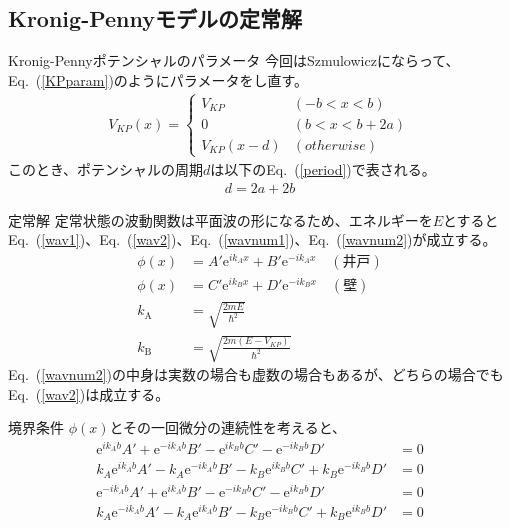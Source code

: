 \documentclass[unicode, 12pt, aspectratio=169]{beamer}
\newcommand{\eref}[1]{Eq.~(\ref{#1})}
\begin{document}
\subsection{Kronig-Pennyモデルの定常解}
\frame{\insertsubsection}

\begin{frame}
  \begin{block}{Kronig-Pennyポテンシャルのパラメータ}
    今回はSzmulowiczにならって、\eref{KPparam}のようにパラメータをし直す。
    \begin{align}
    V_{KP}(x)=\begin{cases}
    V_{KP}&(-b<x<b)\\
    0&(b<x<b+2a)\\
    V_{KP}(x-d)&(otherwise)
    \end{cases}\label{KPparam}
    \end{align}
     このとき、ポテンシャルの周期$d$は以下の\eref{period}で表される。
    \begin{align}
    d=2a+2b\label{period}
    \end{align}
  \end{block}
\end{frame}

\begin{frame}
  \begin{block}{定常解}
    定常状態の波動関数は平面波の形になるため、エネルギーを$E$とすると
    \eref{wav1}、\eref{wav2}、\eref{wavnum1}、\eref{wavnum2}が成立する。
    \begin{align}
    \phi(x)&=A'\mathrm{e}^{ik_Ax}+B'\mathrm{e}^{-ik_Ax}\quad(井戸)\label{wav1}\\
    \phi(x)&=C'\mathrm{e}^{ik_Bx}+D'\mathrm{e}^{-ik_Bx}\quad(壁)\label{wav2}\\
    k_\mathrm{A}&=\sqrt{\frac{2mE}{\hbar^2}}\label{wavnum1}\\
    k_\mathrm{B}&=\sqrt{\frac{2m(E-V_{KP})}{\hbar^2}}\label{wavnum2}
    \end{align}
   \eref{wavnum2}の中身は実数の場合も虚数の場合もあるが、どちらの場合でも\eref{wav2}は成立する。
  \end{block}
\end{frame}

\begin{frame}
  \begin{block}{境界条件}
    $\phi(x)$とその一回微分の連続性を考えると、
    \begin{align}
    \mathrm{e}^{ik_Ab}A'+\mathrm{e}^{-ik_Ab}B'-\mathrm{e}^{ik_Bb}C'-\mathrm{e}^{-ik_Bb}D'&=0\label{cc1}\\
    k_A\mathrm{e}^{ik_Ab}A'-k_A\mathrm{e}^{-ik_Ab}B'-k_B\mathrm{e}^{ik_Bb}C'+k_B\mathrm{e}^{-ik_Bb}D'&=0\label{cc2}\\
    \mathrm{e}^{-ik_Ab}A'+\mathrm{e}^{ik_Ab}B'-\mathrm{e}^{-ik_Bb}C'-\mathrm{e}^{ik_Bb}D'&=0\label{cc3}\\
    k_A\mathrm{e}^{-ik_Ab}A'-k_A\mathrm{e}^{ik_Ab}B'-k_B\mathrm{e}^{-ik_Bb} C'+k_B\mathrm{e}^{ik_Bb}D'&=0\label{cc4}
    \end{align}
  \end{block}
\end{frame}
\end{document}
